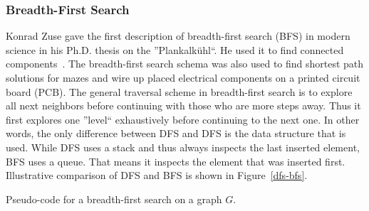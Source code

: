             \subsubsection*{Breadth-First Search} 
                Konrad Zuse gave the first description of breadth-first search (BFS) in modern science in his Ph.D. thesis on the ''Plankalkühl``. 
                He used it to find connected components~\autocite{zuse1948allgemeinen}. 
                The breadth-first search schema was also used to find shortest path solutions for mazes and wire up placed electrical components on a printed circuit board (PCB).
                The general traversal scheme in breadth-first search is to explore all next neighbors before continuing with those who are more steps away. 
                Thus it first explores one ''level`` exhaustively before continuing to the next one. 
                In other words, the only difference between DFS and DFS is the data structure that is used. 
                While DFS uses a stack and thus always inspects the last inserted element, BFS uses a queue.
                That means it inspects the element that was inserted first.
                Illustrative comparison of DFS and BFS is shown in Figure~\ref{dfs-bfs}. 
                
                \begin{algorithm}[htp]
                    \hrulealg
                \caption{Pseudo-code for a breadth-first search on a graph $G$.}\label{bfs}
                \end{algorithm}
                
